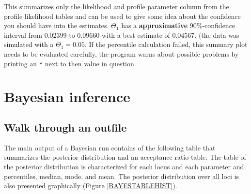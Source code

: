 This summarizes only the likelihood and profile parameter column from the
profile likelihood tables and can be used to give some idea about the 
confidence you should have into the estimates.
$\Theta_1$ has a \textbf{approximative} 90\%-confidence interval from 0.02399 to 0.09660
with a best estimate of 0.04567.
(the data was simulated with a $\Theta_1=0.05$.
If the percentile calculation failed, this summary plot needs to be evaluated carefully, the program warns about possible problems by printing an \texttt{*} next to then value in question.
\newpage

\section{Bayesian inference}

\subsection{Walk through an outfile}

The main output of a Bayesian run contains of the following table that summarizes the posterior distribution and an acceptance ratio table. The table of the posterior distribution is characterized for each locus and each parameter and percentiles, median, mode, and mean. The posterior distribution over all loci is also presented graphically (Figure \ref{BAYESTABLEHIST}). 

